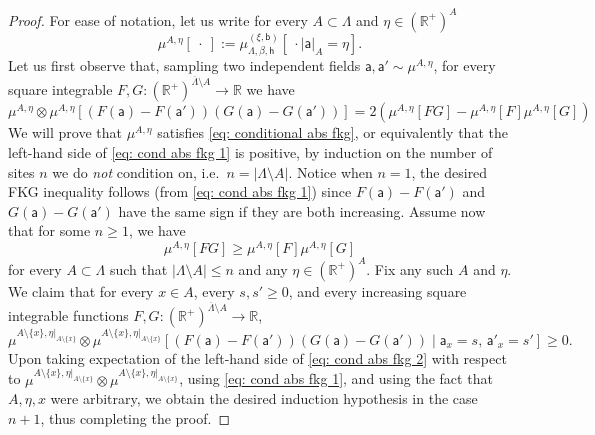 \documentclass[11pt,a4paper]{article}
\theoremstyle{definition}
\numberwithin{equation}{section}
\begin{document}
\begin{proof}
For ease of notation, let us write for every $A \subset \Lambda$ and $\eta \in (\mathbb R^+)^A$
\begin{equation}
\mu^{A,\eta}[\:\cdot\:]:= \mu^{(\xi,\mathsf b)}_{\Lambda,\beta,\mathsf h} [\:\cdot \mid \mathsf a|_A=\eta].
\end{equation}
Let us first observe that, sampling two independent fields $\mathsf a, \mathsf a' \sim \mu^{A,\eta}$, for every square integrable $F,G : (\mathbb R
^+)^{\overline{\Lambda} \setminus A} \rightarrow \mathbb R$ we have 
\begin{equation} \label{eq: cond abs fkg 1}
\mu^{A,\eta}\otimes \mu^{A,\eta}\left[ (F(\mathsf a)-F(\mathsf a'))(G(\mathsf a)-G(\mathsf a')) \right]  = 2\left( \mu^{A,\eta}[FG] - \mu^{A,\eta}[F]\mu^{A,\eta}[G]\right)
\end{equation}
We will prove that $\mu^{A,\eta}$ satisfies \eqref{eq: conditional abs fkg}, or equivalently that the left-hand side of \eqref{eq: cond abs fkg 1} is positive, by induction on the number of sites $n$ we do \emph{not} condition on, i.e.\ $n=|\Lambda\setminus A|$. Notice when $n=1$, the desired FKG inequality follows (from \eqref{eq: cond abs fkg 1}) since $F(\mathsf a)-F(\mathsf a')$ and $G(\mathsf a)-G(\mathsf a')$ have the same sign if they are both increasing. Assume now that for some $n \geq 1$, we have
\begin{equation}
\mu^{A,\eta}[FG] \geq \mu^{A,\eta}[F]\mu^{A,\eta}[G]
\end{equation}
for every $A \subset \Lambda$ such that $|\Lambda \setminus A|\leq n$ and any $\eta \in (\mathbb R^+)^A$. Fix any such $A$ and $\eta$. We claim that for every $x \in A$, every $s,s' \geq 0$, and every increasing square integrable functions $F,G:(\mathbb R^+)^{\overline{\Lambda}\setminus A} \rightarrow \mathbb R$,
\begin{equation} \label{eq: cond abs fkg 2}
\mu^{A\setminus \{x\}, \eta|_{A\setminus \{x\}}} \otimes \mu^{A\setminus \{x\}, \eta|_{A\setminus \{x\}}} \left[ (F(\mathsf a)-F(\mathsf a'))(G(\mathsf a)-G(\mathsf a'))  \mid \mathsf a_x=s, \, \mathsf a'_x = s'\right] \geq 0.
\end{equation}
Upon taking expectation of the left-hand side of \eqref{eq: cond abs fkg 2} with respect to $\mu^{A\setminus \{x\},\eta|_{A\setminus \{x\}}}\otimes \mu^{A\setminus \{x\},\eta|_{A\setminus \{x\}}}$, using \eqref{eq: cond abs fkg 1}, and using the fact that $A,\eta,x$ were arbitrary, we obtain the desired induction hypothesis in the case $n+1$, thus completing the proof. 


\end{proof}
\end{document}
